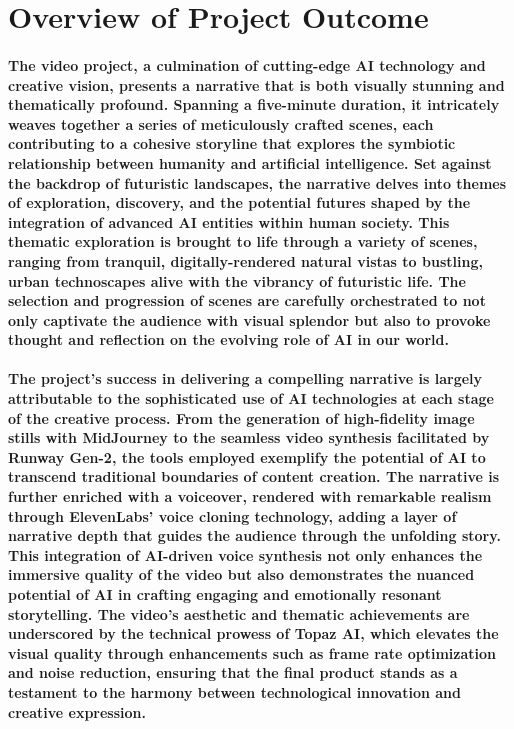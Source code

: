 \documentclass[11pt,a4paper,oneside]{report}
\begin{document}
\section{Overview of Project Outcome}

\paragraph{The video project, a culmination of cutting-edge AI technology and creative vision, presents a narrative that is both visually stunning and thematically profound. Spanning a five-minute duration, it intricately weaves together a series of meticulously crafted scenes, each contributing to a cohesive storyline that explores the symbiotic relationship between humanity and artificial intelligence. Set against the backdrop of futuristic landscapes, the narrative delves into themes of exploration, discovery, and the potential futures shaped by the integration of advanced AI entities within human society. This thematic exploration is brought to life through a variety of scenes, ranging from tranquil, digitally-rendered natural vistas to bustling, urban technoscapes alive with the vibrancy of futuristic life. The selection and progression of scenes are carefully orchestrated to not only captivate the audience with visual splendor but also to provoke thought and reflection on the evolving role of AI in our world.}

\paragraph{The project's success in delivering a compelling narrative is largely attributable to the sophisticated use of AI technologies at each stage of the creative process. From the generation of high-fidelity image stills with MidJourney to the seamless video synthesis facilitated by Runway Gen-2, the tools employed exemplify the potential of AI to transcend traditional boundaries of content creation. The narrative is further enriched with a voiceover, rendered with remarkable realism through ElevenLabs' voice cloning technology, adding a layer of narrative depth that guides the audience through the unfolding story. This integration of AI-driven voice synthesis not only enhances the immersive quality of the video but also demonstrates the nuanced potential of AI in crafting engaging and emotionally resonant storytelling. The video's aesthetic and thematic achievements are underscored by the technical prowess of Topaz AI, which elevates the visual quality through enhancements such as frame rate optimization and noise reduction, ensuring that the final product stands as a testament to the harmony between technological innovation and creative expression.}
\end{document}
